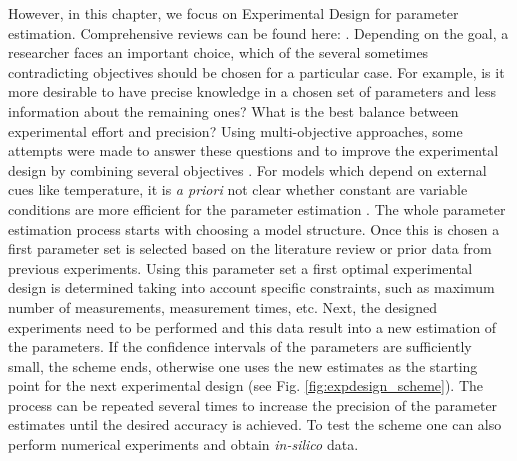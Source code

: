 \documentclass[10pt,A4paper]{article}
\begin{document}
However, in this chapter, we focus on Experimental Design for parameter estimation.
Comprehensive reviews can be found here: \cite{atkinsonDevelopmentsDesignExperiments1982, franceschiniModelbasedDesignExperiments2008,sunParameterEstimation2011,vilasPredictiveFood2016}.
Depending on the goal, a researcher faces an important choice, which of the several sometimes contradicting objectives should be chosen for a particular case.
For example, is it more desirable to have precise knowledge in a chosen set of parameters and less information about the remaining ones? What is the best balance between experimental effort and precision?
Using multi-objective approaches, some attempts were made to answer these questions and to improve the experimental design by combining several objectives \cite{telenOptimalExperimentDesign2012, logistRobustMultiobjectiveOptimal2011}.
For models which depend on external cues like temperature, it is {\it a priori} not clear whether constant are variable conditions are more efficient for the parameter estimation \cite{versyckIntroducingOptimal1999,garciaQualityShelflifePrediction2015}.
The whole parameter estimation process starts with choosing a model structure. Once this is chosen a first parameter set is selected based on the literature review or prior data from previous experiments.
Using this parameter set a first optimal experimental design is determined taking into account specific constraints, such as maximum number of measurements, measurement times, etc. Next, the designed experiments need to be performed and this data result into a new estimation of the parameters.
If the confidence intervals of the parameters are sufficiently small, the scheme ends, otherwise one uses the new estimates as the starting point for the next experimental design (see Fig. \ref{fig:expdesign_scheme}).
The process can be repeated several times to increase the precision of the parameter estimates until the desired accuracy is achieved.
To test the scheme one can also perform numerical experiments and obtain {\it in-silico} data.
\end{document}
